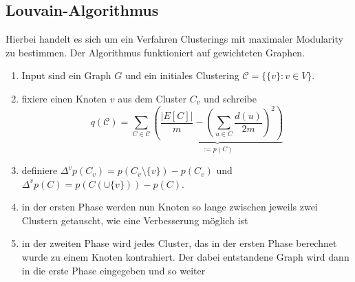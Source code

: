 \documentclass[a4paper, 12pt]{article}
\theoremstyle{plain}
\theoremstyle{definition}
\theoremstyle{lemma}
\theoremstyle{remark}
\theoremstyle{corollary}
\theoremstyle{example}
\begin{document}
	\subsection{Louvain-Algorithmus}
	Hierbei handelt es sich um ein Verfahren Clusterings mit maximaler Modularity zu bestimmen. Der Algorithmus funktioniert auf gewichteten Graphen. \begin{enumerate}
		\item Input sind ein Graph $G$ und ein initiales Clustering $\mathcal{C} = \{\{v\}: v \in V\}$.
		\item fixiere einen Knoten $v$ aus dem Cluster $C_v$ und schreibe \[q(\mathcal{C}) = \sum_{C \in \mathcal{C}}\underbrace{\left(\frac{\left|E[C]\right|}{m} - \left(\sum_{u \in C} \frac{d(u)}{2m}\right)^2\right)}_{:=p(C)}\]
		\item definiere $\Delta^v p(C_v) = p(C_v \setminus\{v\})-p(C_v)$ und $\Delta^v p(C) = p(C(\cup \{v\})) - p(C)$.
		\item in der ersten Phase werden nun Knoten so lange zwischen jeweils zwei Clustern getauscht, wie eine Verbesserung möglich ist
		\item in der zweiten Phase wird jedes Cluster, das in der ersten Phase berechnet wurde zu einem Knoten kontrahiert. Der dabei entstandene Graph wird dann in die erste Phase eingegeben und so weiter
	\end{enumerate}
\end{document}
